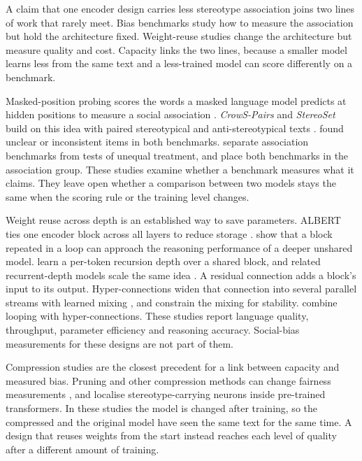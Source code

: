 \documentclass[sigconf,natbib=true]{acmart}
\begin{document}
A claim that one encoder design carries less stereotype association joins two
lines of work that rarely meet. Bias benchmarks study how to measure the
association but hold the architecture fixed. Weight-reuse studies change the
architecture but measure quality and cost. Capacity links the two lines, because
a smaller model learns less from the same text and a less-trained model can score
differently on a benchmark.

Masked-position probing scores the words a masked language model predicts at
hidden positions to measure a social association
\citep{kurita2019measuring}. \emph{CrowS-Pairs} and \emph{StereoSet} build on
this idea with paired stereotypical and anti-stereotypical texts
\citep{nangia2020crows,nadeem2021stereoset}. \citet{blodgett2021salmon} found
unclear or inconsistent items in both benchmarks. \citet{wang2025difference}
separate association benchmarks from tests of unequal treatment, and place both
benchmarks in the association group. These studies examine whether a benchmark
measures what it claims. They leave open whether a comparison between two
models stays the same when the scoring rule or the training level changes.

Weight reuse across depth is an established way to save parameters. ALBERT ties
one encoder block across all layers to reduce storage \citep{lan2020albert}.
\citet{saunshi2025looped} show that a block repeated in a loop can approach the
reasoning performance of a deeper unshared model. \citet{bae2025mor} learn a
per-token recursion depth over a shared block, and related recurrent-depth
models scale the same idea \citep{geiping2025huginn,zhu2025ouro,frey2026adaptive}.
A residual connection adds a block's input to its output.
Hyper-connections widen that connection into several parallel streams with
learned mixing \citep{zhu2025hyperconnections}, and \citet{xie2025mhc} constrain
the mixing for stability. \citet{zeitoun2026hyperloop} combine looping with
hyper-connections. These studies report language quality, throughput, parameter
efficiency and reasoning accuracy. Social-bias measurements for these designs are
not part of them.

Compression studies are the closest precedent for a link between capacity and
measured bias. Pruning and other compression methods can change fairness
measurements \citep{hooker2020characterising,xu2022compression,ramesh2023comparative},
and \citet{voria2026tracing} localise stereotype-carrying neurons inside
pre-trained transformers. In these studies the model is changed after training,
so the compressed and the original model have seen the same text for the same
time. A design that reuses weights from the start instead reaches each level of
quality after a different amount of training.
\end{document}

